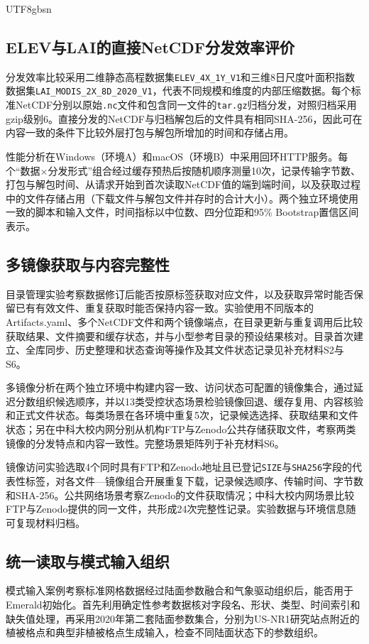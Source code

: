 \documentclass[numdoi]{chinese}
\begin{document}
\begin{CJK}{UTF8}{gbsn}
\subsection{ELEV与LAI的直接NetCDF分发效率评价}
分发效率比较采用二维静态高程数据集\nolinkurl{ELEV_4X_1Y_V1}和三维8日尺度叶面积指数数据集\nolinkurl{LAI_MODIS_2X_8D_2020_V1}，代表不同规模和维度的内部压缩数据。每个标准NetCDF分别以原始\nolinkurl{.nc}文件和包含同一文件的\nolinkurl{tar.gz}归档分发，对照归档采用gzip级别6。直接分发的NetCDF与归档解包后的文件具有相同SHA-256，因此可在内容一致的条件下比较外层打包与解包所增加的时间和存储占用。

性能分析在Windows（环境A）和macOS（环境B）中采用回环HTTP服务。每个“数据\ensuremath{\times}分发形式”组合经过缓存预热后按随机顺序测量10次，记录传输字节数、打包与解包时间、从请求开始到首次读取NetCDF值的端到端时间，以及获取过程中的文件存储占用（下载文件与解包文件并存时的合计大小）。两个独立环境使用一致的脚本和输入文件，时间指标以中位数、四分位距和95\% Bootstrap置信区间表示。

\subsection{多镜像获取与内容完整性}
目录管理实验考察数据修订后能否按原标签获取对应文件，以及获取异常时能否保留已有有效文件、重复获取时能否保持内容一致。实验使用不同版本的Artifacts.yaml、多个NetCDF文件和两个镜像端点，在目录更新与重复调用后比较获取结果、文件摘要和缓存状态，并与小型参考目录的预设结果核对。目录首次建立、全库同步、历史整理和状态查询等操作及其文件状态记录见补充材料S2与S6。

多镜像分析在两个独立环境中构建内容一致、访问状态可配置的镜像集合，通过延迟分数组织候选顺序，并以13类受控状态场景检验镜像回退、缓存复用、内容核验和正式文件状态。每类场景在各环境中重复5次，记录候选选择、获取结果和文件状态；另在中科大校内网分别从机构FTP与Zenodo公共存储获取文件，考察两类镜像的分发特点和内容一致性。完整场景矩阵列于补充材料S6。

镜像访问实验选取4个同时具有FTP和Zenodo地址且已登记\nolinkurl{SIZE}与\nolinkurl{SHA256}字段的代表性标签，对各文件—镜像组合开展重复下载，记录候选顺序、传输时间、字节数和SHA-256。公共网络场景考察Zenodo的文件获取情况；中科大校内网场景比较FTP与Zenodo提供的同一文件，共形成24次完整性记录。实验数据与环境信息随可复现材料归档。

\subsection{统一读取与模式输入组织}
模式输入案例考察标准网格数据经过陆面参数融合和气象驱动组织后，能否用于Emerald初始化。首先利用确定性参考数据核对字段名、\allowbreak{}形状、\allowbreak{}类型、\allowbreak{}时间索引和缺失值处理，再采用2020年第二套陆面参数集合，分别为US-NR1研究站点附近的植被格点和典型非植被格点生成输入，检查不同陆面状态下的参数组织。


\end{CJK}
\end{document}
